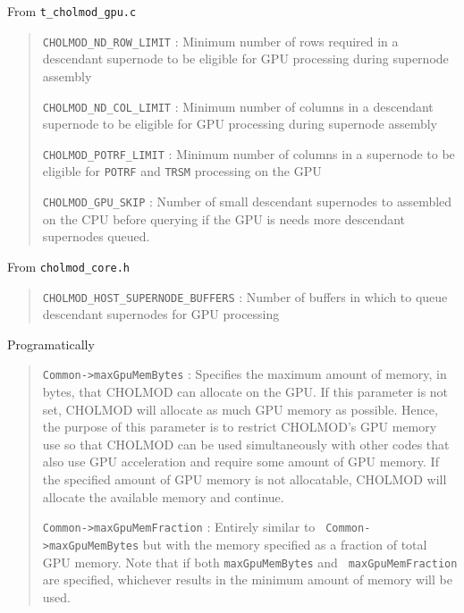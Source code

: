 \documentclass[11pt]{article}
\begin{document}
\bigskip

From {\tt t\_cholmod\_gpu.c}

\begin{quote}
  {\tt CHOLMOD\_ND\_ROW\_LIMIT} : Minimum number of rows required in a
  descendant supernode to be eligible for GPU processing during supernode
  assembly


  {\tt CHOLMOD\_ND\_COL\_LIMIT} : Minimum number of columns in a descendant
  supernode to be eligible for GPU processing during supernode assembly


  {\tt CHOLMOD\_POTRF\_LIMIT} : Minimum number of columns in a supernode to be
  eligible for {\tt POTRF} and {\tt TRSM} processing on the GPU


  {\tt CHOLMOD\_GPU\_SKIP} : Number of small descendant supernodes to assembled
  on the CPU before querying if the GPU is needs more descendant supernodes
  queued.

\end{quote}

From {\tt cholmod\_core.h}

\begin{quote}
  {\tt CHOLMOD\_HOST\_SUPERNODE\_BUFFERS} : Number of buffers in which to queue
  descendant supernodes for GPU processing

\end{quote}

Programatically

\begin{quote}

  {\tt Common->maxGpuMemBytes} : Specifies the maximum amount of memory, in
  bytes, that CHOLMOD can allocate on the GPU.  If this parameter is not set,
  CHOLMOD will allocate as much GPU memory as possible.  Hence, the purpose of
  this parameter is to restrict CHOLMOD's GPU memory use so that CHOLMOD can be
  used simultaneously with other codes that also use GPU acceleration and
  require some amount of GPU memory.  If the specified amount of GPU memory is
  not allocatable, CHOLMOD will allocate the available memory and continue.

  {\tt Common->maxGpuMemFraction} : Entirely similar to {\tt
  Common->maxGpuMemBytes} but with the memory specified as a fraction of total
  GPU memory.  Note that if both {\tt maxGpuMemBytes} and {\tt
  maxGpuMemFraction} are specified, whichever results in the minimum amount of
  memory will be used.

\end{quote}
\end{document}
